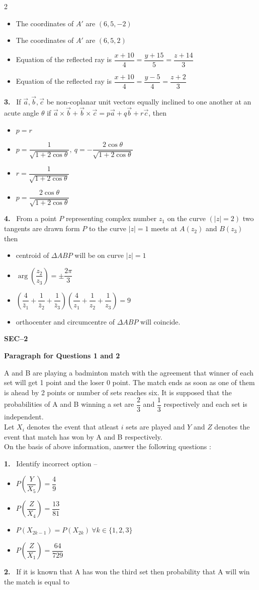 \documentclass[10pt]{extarticle}
\newcommand{\sect}[1]{\par\smallskip\noindent\textbf{#1}\par}
\newcommand{\qn}[1]{\par\smallskip\noindent\textbf{#1.}~}
\newcommand{\paraq}[2]{\par\smallskip\noindent\textbf{Paragraph for Questions #1 and #2}\par}
\newenvironment{qoptions}{\begin{itemize}[leftmargin=1.8em,itemsep=1pt,topsep=2pt,label={}]}{\end{itemize}}
\newcommand{\opt}[2]{\item[(#1)] #2}
\begin{document}
\begin{multicols}{2}
\begin{qoptions}
\opt{A}{The coordinates of $A'$ are $(6,5,-2)$}
\opt{B}{The coordinates of $A'$ are $(6,5,2)$}
\opt{C}{Equation of the reflected ray is $\dfrac{x+10}4=\dfrac{y+15}5=\dfrac{z+14}3$}
\opt{D}{Equation of the reflected ray is $\dfrac{x+10}4=\dfrac{y-5}4=\dfrac{z+2}3$}
\end{qoptions}
\qn{3} If $\vec a,\vec b,\vec c$ be non-coplanar unit vectors equally inclined to one another at an acute angle $\theta$ if $\vec a\times\vec b+\vec b\times\vec c=p\vec a+q\vec b+r\vec c$, then
\begin{qoptions}
\opt{A}{$p=r$}
\opt{B}{$p=\dfrac1{\sqrt{1+2\cos\theta}},\ q=-\dfrac{2\cos\theta}{\sqrt{1+2\cos\theta}}$}
\opt{C}{$r=\dfrac1{\sqrt{1+2\cos\theta}}$}
\opt{D}{$p=\dfrac{2\cos\theta}{\sqrt{1+2\cos\theta}}$}
\end{qoptions}
\qn{4} From a point $P$ representing complex number $z_1$ on the curve $(|z|=2)$ two tangents are drawn form $P$ to the curve $|z|=1$ meets at $A(z_2)$ and $B(z_3)$ then
\begin{qoptions}
\opt{A}{centroid of $\Delta ABP$ will be on curve $|z|=1$}
\opt{B}{$\arg\left(\dfrac{z_2}{z_3}\right)=\pm\dfrac{2\pi}3$}
\opt{C}{$\left(\dfrac4{\bar z_1}+\dfrac1{\bar z_2}+\dfrac1{\bar z_3}\right)\left(\dfrac4{z_1}+\dfrac1{z_2}+\dfrac1{z_3}\right)=9$}
\opt{D}{orthocenter and circumcentre of $\Delta ABP$ will coincide.}
\end{qoptions}
\sect{SEC--2}
\paraq{1}{2}
A and B are playing a badminton match with the agreement that winner of each set will get 1 point and the loser 0 point. The match ends as soon as one of them is ahead by 2 points or number of sets reaches six. It is supposed that the probabilities of A and B winning a set are $\dfrac23$ and $\dfrac13$ respectively and each set is independent.\\
Let $X_i$ denotes the event that atleast $i$ sets are played and $Y$ and $Z$ denotes the event that match has won by A and B respectively.\\
On the basis of above information, answer the following questions :
\qn{1} Identify incorrect option --
\begin{qoptions}
\opt{A}{$P\left(\dfrac Y{X_5}\right)=\dfrac49$}
\opt{B}{$P\left(\dfrac Z{X_4}\right)=\dfrac{13}{81}$}
\opt{C}{$P(X_{2k-1})=P(X_{2k})\ \forall k\in\{1,2,3\}$}
\opt{D}{$P\left(\dfrac Z{X_1}\right)=\dfrac{64}{729}$}
\end{qoptions}
\qn{2} If it is known that A has won the third set then probability that A will win the match is equal to

\end{multicols}
\end{document}

